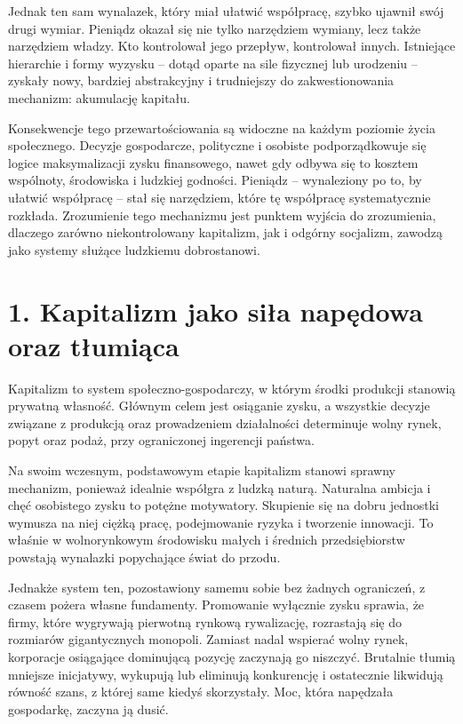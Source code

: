 \documentclass[12pt,a4paper]{article}
\begin{document}
Jednak ten sam wynalazek, który miał ułatwić współpracę, szybko ujawnił swój drugi wymiar. Pieniądz okazał się nie tylko narzędziem wymiany, lecz także narzędziem władzy. Kto kontrolował jego przepływ, kontrolował innych. Istniejące hierarchie i formy wyzysku -- dotąd oparte na sile fizycznej lub urodzeniu -- zyskały nowy, bardziej abstrakcyjny i trudniejszy do zakwestionowania mechanizm: akumulację kapitału.

Konsekwencje tego przewartościowania są widoczne na każdym poziomie życia społecznego. Decyzje gospodarcze, polityczne i osobiste podporządkowuje się logice maksymalizacji zysku finansowego, nawet gdy odbywa się to kosztem wspólnoty, środowiska i ludzkiej godności. Pieniądz -- wynaleziony po to, by ułatwić współpracę -- stał się narzędziem, które tę współpracę systematycznie rozkłada. Zrozumienie tego mechanizmu jest punktem wyjścia do zrozumienia, dlaczego zarówno niekontrolowany kapitalizm, jak i odgórny socjalizm, zawodzą jako systemy służące ludzkiemu dobrostanowi.

\section*{1. Kapitalizm jako siła napędowa oraz tłumiąca}

Kapitalizm to system społeczno-gospodarczy, w którym środki produkcji stanowią prywatną własność. Głównym celem jest osiąganie zysku, a wszystkie decyzje związane z produkcją oraz prowadzeniem działalności determinuje wolny rynek, popyt oraz podaż, przy ograniczonej ingerencji państwa.

Na swoim wczesnym, podstawowym etapie kapitalizm stanowi sprawny mechanizm, ponieważ idealnie współgra z ludzką naturą. Naturalna ambicja i chęć osobistego zysku to potężne motywatory. Skupienie się na dobru jednostki wymusza na niej ciężką pracę, podejmowanie ryzyka i tworzenie innowacji. To właśnie w wolnorynkowym środowisku małych i średnich przedsiębiorstw powstają wynalazki popychające świat do przodu.

Jednakże system ten, pozostawiony samemu sobie bez żadnych ograniczeń, z czasem pożera własne fundamenty. Promowanie wyłącznie zysku sprawia, że firmy, które wygrywają pierwotną rynkową rywalizację, rozrastają się do rozmiarów gigantycznych monopoli. Zamiast nadal wspierać wolny rynek, korporacje osiągające dominującą pozycję zaczynają go niszczyć. Brutalnie tłumią mniejsze inicjatywy, wykupują lub eliminują konkurencję i ostatecznie likwidują równość szans, z której same kiedyś skorzystały. Moc, która napędzała gospodarkę, zaczyna ją dusić.
\end{document}
